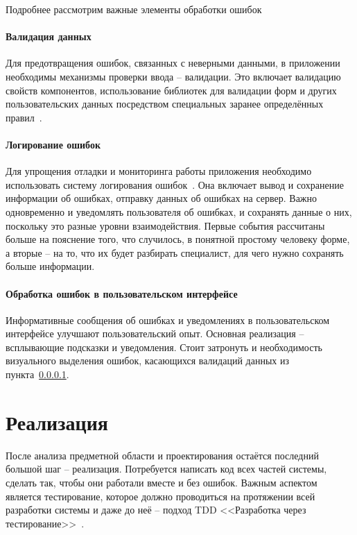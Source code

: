 \documentclass[a4paper,article]{article}
\begin{document}
\begin{sloppypar}
    Подробнее рассмотрим важные элементы обработки ошибок

    \paragraph{Валидация данных}\label{Проектирование клиента. Валидация данных}

    Для предотвращения ошибок, связанных с неверными данными, в приложении необходимы механизмы проверки ввода -- валидации. Это включает валидацию свойств компонентов, использование библиотек для валидации форм и других пользовательских данных посредством специальных заранее определённых правил~\cite{baeldungbook}.

    \paragraph{Логирование ошибок}

    Для упрощения отладки и мониторинга работы приложения необходимо использовать систему логирования ошибок~\cite{cleancode}. Она включает вывод и сохранение информации об ошибках, отправку данных об ошибках на сервер. Важно одновременно и уведомлять пользователя об ошибках, и сохранять данные о них, поскольку это разные уровни взаимодействия. Первые события рассчитаны больше на пояснение того, что случилось, в понятной простому человеку форме, а вторые -- на то, что их будет разбирать специалист, для чего нужно сохранять больше информации.

    \paragraph{Обработка ошибок в пользовательском интерфейсе}

    Информативные сообщения об ошибках и уведомлениях в пользовательском интерфейсе улучшают пользовательский опыт. Основная реализация -- всплывающие подсказки и уведомления. Стоит затронуть и необходимость визуального выделения ошибок, касающихся валидаций данных из пункта~\ref{Проектирование клиента. Валидация данных}.

    \newpage

    \section{Реализация}\label{Реализация}

    После анализа предметной области и проектирования остаётся последний большой шаг -- реализация. Потребуется написать код всех частей системы, сделать так, чтобы они работали вместе и без ошибок. Важным аспектом является тестирование, которое должно проводиться на протяжении всей разработки системы и даже до неё -- подход TDD <<Разработка через тестирование>>~\cite{tdd}.


\end{sloppypar}
\end{document}
